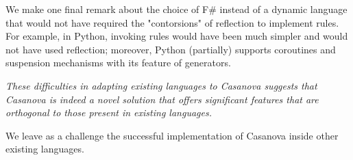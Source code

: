 We make one final remark about the choice of F\# instead of a dynamic language that would not have required the "contorsions" of reflection to implement rules. For example, in Python, invoking rules would have been much simpler and would not have used reflection; moreover, Python (partially) supports coroutines and suspension mechanisms with its feature of generators.

\textit{These difficulties in adapting existing languages to Casanova suggests that Casanova is indeed a novel solution that offers significant features that are orthogonal to those present in existing languages.}

We leave as a challenge the successful implementation of Casanova inside other existing languages.

